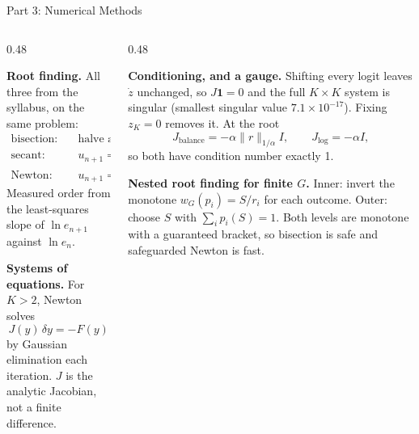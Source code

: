 \documentclass[aspectratio=169,10pt]{beamer}
\begin{document}
\begin{frame}{Part 3: Numerical Methods}

\footnotesize
\begin{columns}[T,onlytextwidth]
\begin{column}{0.48\textwidth}

\textbf{Root finding.} All three from the syllabus, on the same problem:
\[
\begin{aligned}
\text{bisection:} &\quad \text{halve a sign-change bracket} \\
\text{secant:}    &\quad u_{n+1}=u_n-F_n\tfrac{u_n-u_{n-1}}{F_n-F_{n-1}} \\
\text{Newton:}    &\quad u_{n+1}=u_n-F(u_n)/F'(u_n)
\end{aligned}
\]
Measured order from the least-squares slope of $\ln e_{n+1}$ against $\ln e_n$.

\medskip
\textbf{Systems of equations.} For $K>2$, Newton solves
\[
  J(y)\,\delta y=-F(y)
\]
by Gaussian elimination each iteration. $J$ is the analytic Jacobian, not a
finite difference.

\end{column}
\begin{column}{0.48\textwidth}

\textbf{Conditioning, and a gauge.}
Shifting every logit leaves $\dot z$ unchanged, so $J\mathbf 1=0$ and the full
$K\times K$ system is \alert{singular} (smallest singular value
$7.1\times10^{-17}$). Fixing $z_K=0$ removes it. At the root
\[
  J_{\text{balance}}=-\alpha\lVert r\rVert_{1/\alpha}I,
  \qquad
  J_{\text{log}}=-\alpha I,
\]
so both have condition number exactly 1.

\medskip
\textbf{Nested root finding for finite $G$.}
Inner: invert the monotone $w_G(p_i)=S/r_i$ for each outcome.
Outer: choose $S$ with $\sum_i p_i(S)=1$. Both levels are monotone with a
guaranteed bracket, so bisection is safe and safeguarded Newton is fast.

\end{column}
\end{columns}
\end{frame}
\end{document}
